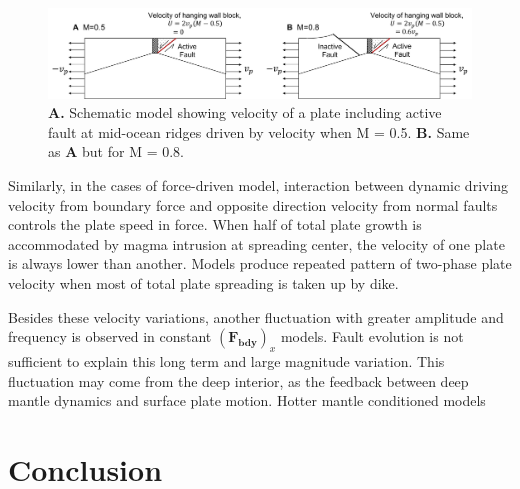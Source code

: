 \documentclass[letterpaper,12pt,notitle]{memphisthesis}                     %
\begin{document}
\begin{figure}[!htb]
	\centering
	\includegraphics[width=0.99\linewidth]{./figs/hangingwall.pdf}
	\caption{\textbf{A.} Schematic model showing velocity of a plate including active fault at mid-ocean ridges driven by velocity when M = 0.5. \textbf{B.} Same as \textbf{A} but for M = 0.8.}
	\label{fig:hangingwall}
\end{figure}


Similarly, in the cases of force-driven model, interaction between dynamic driving velocity from boundary force and opposite direction velocity from normal faults controls the plate speed in force.
When half of total plate growth is accommodated by magma intrusion at spreading center, the velocity of one plate is always lower than another. Models produce repeated pattern of two-phase plate velocity when most of total plate spreading is taken up by dike.

Besides these velocity variations, another fluctuation with greater amplitude and frequency is observed in constant $(\boldsymbol{F_{bdy}})_x$ models. Fault evolution is not sufficient to explain this long term and large magnitude variation. This fluctuation may come from the deep interior, as the feedback between deep mantle dynamics and surface plate motion. Hotter mantle conditioned models 

\chapter{Conclusion}

\end{document}
